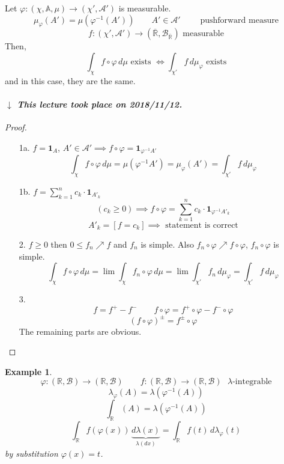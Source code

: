 \documentclass[a4paper]{article}
\newcounter{lecref}[section]
\numberwithin{lecref}{section}
\theoremstyle{break}
\newtheorem{example}[lecref]{Example}
\newcommand{\dateref}[1]{%
  \begin{mdframed}[backgroundcolor=gray!10,innerbottommargin=0pt,innertopmargin=0pt]
    \paragraph{\textit{$\downarrow$ This lecture took place on #1.}}%
  \end{mdframed}%
}
\begin{document}
\begin{theorem}
  Let $\varphi: (\chi, \mathbb A, \mu) \to (\chi', \mathcal A')$ is measurable.
  \[ \mu_{\varphi}(A') = \mu(\varphi^{-1}(A')) \qquad A' \in \mathcal A' \qquad \text{ pushforward measure} \]
  \[ f: (\chi', \mathcal A') \to (\overline{\mathbb R}, \mathcal B_{\overline{\mathbb R}}) \text{ measurable} \]
  Then,
  \[ \int_{\chi} f \circ \varphi \, d\mu \text{ exists } \iff \int_{\chi'} f \, d\mu_{\varphi} \text{ exists} \]
  and in this case, they are the same.
\end{theorem}

\dateref{2018/11/12}

\begin{proof}
  \begin{enumerate}
    \item[1a.] $f = \mathbf{1}_A$, $A' \in \mathcal A' \implies f \circ \varphi = \mathbf{1}_{\varphi^{-1} A'}$
      \[ \int_{\chi} f\circ \varphi \, d\mu = \mu(\varphi^{-1} A') = \mu_{\varphi}(A') = \int_{\chi'} f \, d\mu_{\varphi} \]
    \item[1b.] $f = \sum_{k=1}^n c_k \cdot \mathbf{1}_{A'_k}$
      \[ (c_k \geq 0) \implies f \circ \varphi = \sum_{k=1}^n c_k \cdot \mathbf{1}_{\varphi^{-1} A'_k} \]
      \[ A'_k = [f = c_k] \implies \text{ statement is correct} \]
    \item[2.]
      $f \geq 0$ then $0 \leq f_n \nearrow f$ and $f_n$ is simple.
      Also $f_n \circ \varphi \nearrow f \circ \varphi$, $f_n \circ \varphi$ is simple.
      \[ \int_\chi f \circ \varphi \, d\mu = \lim \int_\chi f_n \circ \varphi \, d\mu = \lim \int_{\chi'} f_n \, d\mu_{\varphi} = \int_{\chi'} f \, d\mu_{\varphi} \]
    \item[3.]
      \[ f = f^+ - f^- \qquad f \circ \varphi = f^+ \circ \varphi - f^- \circ \varphi \]
      \[ (f \circ \varphi)^{\pm} = f^{\pm} \circ \varphi \]
      The remaining parts are obvious.
  \end{enumerate}
\end{proof}

\begin{example}
  \[ \varphi: (\mathbb R, \mathcal B) \to (\mathbb R, \mathcal B) \qquad f: (\mathbb R, \mathcal B) \to (\mathbb R, \mathcal B) \text{ $\lambda$-integrable} \]
  \[ \lambda_{\varphi}(A) = \lambda(\varphi^{-1}(A)) \]
  \[ \int_{\mathbb R} (A) = \lambda(\varphi^{-1}(A)) \]
  \[ \int_{\mathbb R} f(\varphi(x)) \, \underbrace{d\lambda(x)}_{\lambda(dx)} = \int_{\mathbb R} f(t) \, d\lambda_{\varphi}(t) \]
  by substitution $\varphi(x) = t$.
\end{example}
\end{document}
